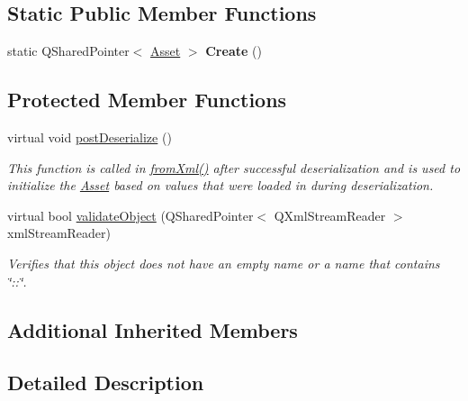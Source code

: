\subsection*{Static Public Member Functions}
\begin{DoxyCompactItemize}
\item 
\hypertarget{class_picto_1_1_starter_container_a992630be1edeff7950f47ef3dec1b41d}{static Q\-Shared\-Pointer$<$ \hyperlink{class_picto_1_1_asset}{Asset} $>$ {\bfseries Create} ()}\label{class_picto_1_1_starter_container_a992630be1edeff7950f47ef3dec1b41d}

\end{DoxyCompactItemize}
\subsection*{Protected Member Functions}
\begin{DoxyCompactItemize}
\item 
virtual void \hyperlink{class_picto_1_1_starter_container_af70a20b1c3ea88047a83098a985338e8}{post\-Deserialize} ()
\begin{DoxyCompactList}\small\item\em This function is called in \hyperlink{class_picto_1_1_asset_a8bed4da09ecb1c07ce0dab313a9aba67}{from\-Xml()} after successful deserialization and is used to initialize the \hyperlink{class_picto_1_1_asset}{Asset} based on values that were loaded in during deserialization. \end{DoxyCompactList}\item 
\hypertarget{class_picto_1_1_starter_container_a53a89fc8bb75a5cc2cee113c45a44015}{virtual bool \hyperlink{class_picto_1_1_starter_container_a53a89fc8bb75a5cc2cee113c45a44015}{validate\-Object} (Q\-Shared\-Pointer$<$ Q\-Xml\-Stream\-Reader $>$ xml\-Stream\-Reader)}\label{class_picto_1_1_starter_container_a53a89fc8bb75a5cc2cee113c45a44015}

\begin{DoxyCompactList}\small\item\em Verifies that this object does not have an empty name or a name that contains \char`\"{}\-::\char`\"{}. \end{DoxyCompactList}\end{DoxyCompactItemize}
\subsection*{Additional Inherited Members}


\subsection{Detailed Description}


